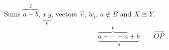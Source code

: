 \documentclass[12pt]{article}
\begin{document}
Sums $\overbrace{a+b}^{2}$, $\underbrace{x\,y}_{k}$, vectors $\overrightarrow{v}$, $\overleftarrow{w}_i$, $a\notin B$ and $X\cong Y$.
\[ \underbrace{\overbrace{a+\cdots+a}^{k}+b}_{n} \qquad \overrightarrow{OP} \]
\end{document}
